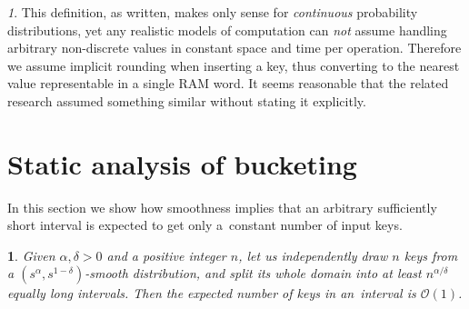 \documentclass[
submission
]{dmtcs-episciences}
\theoremstyle{plain}
\theoremstyle{definition}
\theoremstyle{remark}
\newtheorem*{rem*}{\protect\remarkname}
\theoremstyle{plain}
\newtheorem*{lem*}{\protect\lemmaname}
\theoremstyle{plain}
\newcounter{lemma}
\providecommand{\lemmaname}{Lemma}
\providecommand{\remarkname}{Remark}
\def\OO{\mathcal O}
\begin{document}
\begin{rem*}
This definition, as written, makes only sense for \emph{continuous} probability
distributions, yet any realistic models of computation can
\emph{not} assume handling arbitrary non-discrete values in constant
space and time per operation. Therefore we assume implicit rounding
when inserting a key, thus converting to the nearest value representable
in a single RAM word. It seems reasonable that the related research
assumed something similar without stating it explicitly.
\end{rem*}


\section{Static analysis of bucketing}
 \label{sec:smooth-bucket}
In this section we show how smoothness implies that an arbitrary sufficiently
short interval is expected to get only a~constant number of input keys.
\begin{lem*}
\label{lem:smooth-bucket}
Given $\alpha,\delta>0$ and a positive
integer $n$, let us independently draw $n$ keys from a $\left(s^{\alpha},s^{1-\delta}\right)$-smooth
distribution, and split its whole domain into at least $n^{\alpha/\delta}$
equally long intervals. Then the expected number of keys in an~interval
is $\OO(1)$.
\end{lem*}
\end{document}
